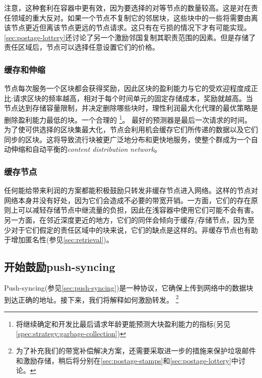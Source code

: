 注意，这种套利在容器中更有效，因为要选择的对等节点的数量较高。这是对在责任领域的重大反对。如果一个节点不复制它的邻居块，这些块中的一些将需要由离该节点更近但离该节点更远的节点请求。这只有在亏损的情况下才有可能实现。\ref{sec:postage-lottery}还讨论了另一个激励邻国复制其职责范围的因素。但是存储了责任区域后，节点可以选择任意设置它们的价格。 


\subsubsection{缓存和伸缩}\label{sec:caching}

节点每次服务一个区块都会获得奖励，因此区块的盈利能力与它的受欢迎程度成正比:请求区块的频率越高，相对于每个时间单元的固定存储成本，奖励就越高。当节点达到存储容量限制，并决定删除哪些块时，理性利润最大化代理的最优策略是删除盈利能力最低的块。一个合理的%
%
\footnote{将继续确定和开发比最后请求年龄更能预测大块盈利能力的指标(另见\ref{spec:strategy:garbage-collection})}。
最好的预测器是最后一次请求的时间。为了使可供选择的区块集最大化，节点会利用机会缓存它们所传递的数据以及它们同步的区块。这将导致流行块被更广泛地分布和更快地服务，使整个群成为一个自动伸缩和自动平衡的\emph{content distribution network}。


\subsubsection{缓存节点}

任何能给带来利润的方案都能积极鼓励只转发非缓存节点进入网络。这样的节点对网络本身并没有好处，因为它们会造成不必要的带宽开销。一方面，它们的存在原则上可以减轻存储节点中继流量的负担，因此在浅容器中使用它们可能不会有害。另一方面，在邻近深度更近的地方，它们的同伴会倾向于缓存/存储节点，因为至少对于它们假定的责任区域中的块来说，它们的缺点是这样的。非缓存节点也有助于增加匿名性(参见\ref{sec:retrieval})。

\subsection{开始鼓励push-syncing\statusgreen}\label{sec:push-sync-incentives}

\green{}

Push-syncing(参见\ref{sec:push-syncing})是一种协议，它确保上传到网络中的数据块到达正确的地址。接下来，我们将解释如何激励转发。
%
%
\footnote{为了补充我们的带宽补偿解决方案，还需要采取进一步的措施来保护垃圾邮件和激励存储，稍后将分别在\ref{sec:postage-stamps}和\ref{sec:postage-lottery}中讨论。}



